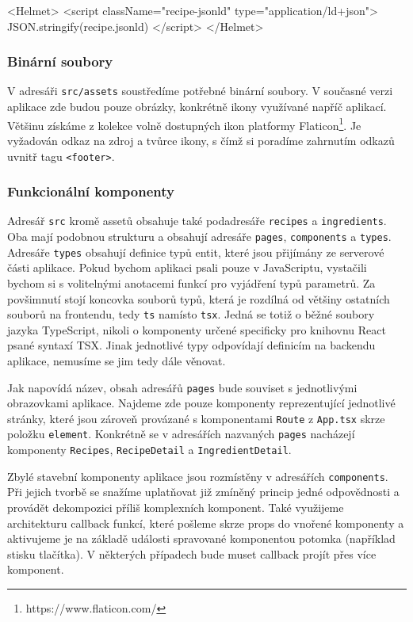 \begingroup
\samepage
\begin{code}
<Helmet>
  <script className="recipe-jsonld" type="application/ld+json">
    {JSON.stringify(recipe.jsonld)}
  </script>
</Helmet>
\end{code}
\endgroup

\subsubsection{Binární soubory}

V adresáři \texttt{src/assets} soustředíme potřebné binární soubory. V současné verzi aplikace zde budou pouze obrázky, konkrétně ikony využívané napříč aplikací. Většinu získáme z kolekce volně dostupných ikon platformy Flaticon\footnote{https://www.flaticon.com/}. Je vyžadován odkaz na zdroj a tvůrce ikony, s čímž si poradíme zahrnutím odkazů uvnitř tagu \texttt{<footer>}.

\subsubsection{Funkcionální komponenty}

Adresář \texttt{src} kromě assetů obsahuje také podadresáře \texttt{recipes} a \texttt{ingredients}. Oba mají podobnou strukturu a obsahují adresáře \texttt{pages}, \texttt{components} a \texttt{types}. Adresáře \texttt{types} obsahují definice typů entit, které jsou přijímány ze serverové části aplikace. Pokud bychom aplikaci psali pouze v JavaScriptu, vystačili bychom si s volitelnými anotacemi funkcí pro vyjádření typů parametrů. Za povšimnutí stojí koncovka souborů typů, která je rozdílná od většiny ostatních souborů na frontendu, tedy \texttt{ts} namísto \texttt{tsx}. Jedná se totiž o běžné soubory jazyka TypeScript, nikoli o komponenty určené specificky pro knihovnu React psané syntaxí TSX. Jinak jednotlivé typy odpovídají definicím na backendu aplikace, nemusíme se jim tedy dále věnovat.

Jak napovídá název, obsah adresářů \texttt{pages} bude souviset s jednotlivými obrazovkami aplikace. Najdeme zde pouze komponenty reprezentující jednotlivé stránky, které jsou zároveň provázané s komponentami \texttt{Route} z \texttt{App.tsx} skrze položku \texttt{element}. Konkrétně se v adresářích nazvaných \texttt{pages} nacházejí komponenty \texttt{Recipes}, \texttt{RecipeDetail} a \texttt{IngredientDetail}.

Zbylé stavební komponenty aplikace jsou rozmístěny v adresářích \texttt{components}. Při jejich tvorbě se snažíme uplatňovat již zmíněný princip jedné odpovědnosti a provádět dekompozici příliš komplexních komponent. Také využijeme architekturu callback funkcí, které pošleme skrze props do vnořené komponenty a aktivujeme je na základě události spravované komponentou potomka (například stisku tlačítka). V některých případech bude muset callback projít přes více komponent.


